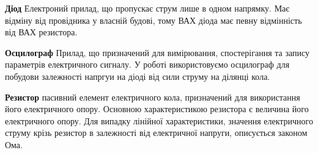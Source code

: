 

\qquad \textbf{Діод}  Електроний прилад, що пропускає струм лише в одном напрямку. Має відміну від провідника у власній будові, тому ВАХ діода має певну відмінність від ВАХ резистора. \par
\textbf{Осцилограф} Прилад, що призначений для вимірювання, спостерігання та запису параметрів електричного сигналу. У роботі використовуємо осцилограф для побудови залежності напргуи на діоді від сили струму на ділянці кола. \par
\textbf{Резистор}  пасивний елемент електричного кола, призначений для використання його електричного опору. Основною характеристикою резистора є величина його електричного опору. Для випадку лінійної характеристики, значення електричного струму крізь резистор в залежності від електричної напруги, описується законом Ома.

